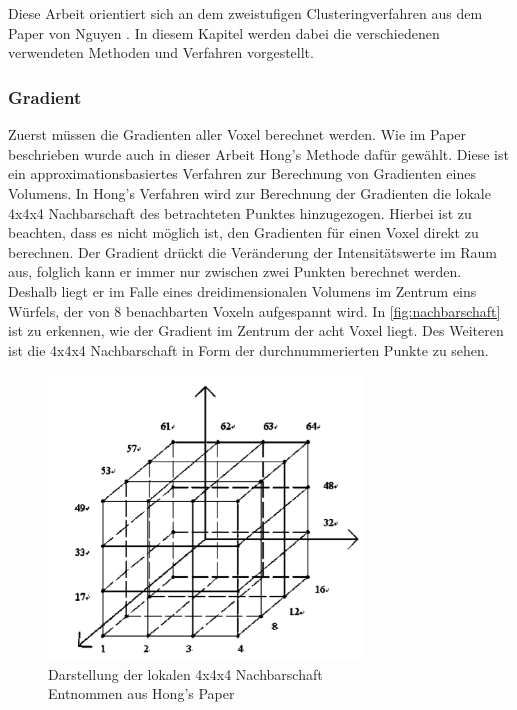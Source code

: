\chapter{}
\label{sec:methods}


Diese Arbeit orientiert sich an dem zweistufigen Clusteringverfahren aus dem Paper von Nguyen \cite{nguyen2012clustering}. In diesem Kapitel werden dabei die verschiedenen verwendeten Methoden und Verfahren vorgestellt.

\subsection{Gradient}

Zuerst müssen die Gradienten aller Voxel berechnet werden. Wie im Paper beschrieben wurde auch in dieser Arbeit Hong's Methode \cite{hong2003method} dafür gewählt. Diese ist ein approximationsbasiertes Verfahren zur Berechnung von Gradienten eines Volumens. 
\newline
In Hong's Verfahren wird zur Berechnung der Gradienten die lokale 4x4x4 Nachbarschaft des betrachteten Punktes hinzugezogen. Hierbei ist zu beachten, dass es nicht möglich ist, den Gradienten für einen Voxel direkt zu berechnen. Der Gradient drückt die Veränderung der Intensitätswerte im Raum aus, folglich kann er immer nur zwischen zwei Punkten berechnet werden. Deshalb liegt er im Falle eines dreidimensionalen Volumens im Zentrum eins Würfels, der von 8 benachbarten Voxeln aufgespannt wird. In \autoref{fig:nachbarschaft} ist zu erkennen, wie der Gradient im Zentrum der acht Voxel liegt. Des Weiteren ist die 4x4x4 Nachbarschaft in Form der durchnummerierten Punkte zu sehen.
\newline

\begin{figure}[!h] 
\centering 
\includegraphics[width=0.75\textwidth]{Logos/VoxelEdges.PNG}
\caption{Darstellung der lokalen 4x4x4 Nachbarschaft  \\ Entnommen aus Hong's Paper} 
\label{fig:nachbarschaft} 
\end{figure}


